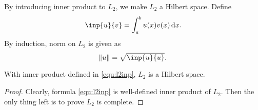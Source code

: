 By introducing inner product to $L_2$, we make $L_2$ a Hilbert space. 
Define
\begin{equation}
\label{equ:l2inp}
    \inp{u}{v} = \int _a ^b u(x)v(x) \diff x.
\end{equation}
By induction, norm on $L_2$ is given as 
\begin{equation}
    \norm{u} = \sqrt{\inp{u}{u}}.
\end{equation}

\begin{thm}
With inner product defined in \ref{equ:l2inp}, $L_2$ is a Hilbert space.
\end{thm}
\begin{proof}
Clearly, formula \ref{equ:l2inp} is well-defined inner product of $L_2$. 
Then the only thing left is to prove $L_2$ is complete. 
\end{proof}